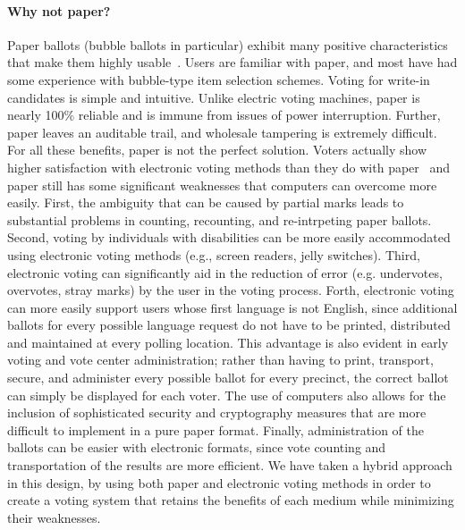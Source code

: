 \paragraph{Why not paper?}
Paper ballots (bubble ballots in particular) exhibit many positive characteristics that make them highly usable~\cite{hfes-06,byrne-baseline}. Users are familiar with paper, and most have had some experience with bubble-type item selection schemes. Voting for write-in candidates is simple and intuitive. Unlike electric voting machines, paper is nearly 100\% reliable and is immune from issues of power interruption. Further, paper leaves an auditable trail, and wholesale tampering is extremely difficult. 
For all these benefits, paper is not the perfect solution. Voters actually show higher satisfaction with electronic voting methods than they do with paper~\cite{everett08chi-dre-usability} and paper still has some significant weaknesses that computers can overcome more easily. 
First, the ambiguity that can be caused by partial marks leads to substantial problems in counting, recounting, and re-intrpeting paper ballots.
Second, voting by individuals with disabilities can be more easily accommodated using electronic voting methods (e.g., screen readers, jelly switches).
Third, electronic voting can significantly aid in the reduction of error (e.g. undervotes, overvotes, stray marks) by the user in the voting process.
Forth, electronic voting can more easily support users whose first language is not English, since additional ballots for every possible language request do not have to be printed, distributed and maintained at every polling location. This advantage is also evident in early voting and vote center administration; rather than having to print, transport, secure, and administer every possible ballot for every precinct, the correct ballot can simply be displayed for each voter. The use of computers also allows for the inclusion of sophisticated security and cryptography measures that are more difficult to implement in a pure paper format.
Finally, administration of the ballots can be easier with electronic formats, since vote counting and transportation of the results are more efficient.
We have taken a hybrid approach in this design, by using both paper and electronic voting methods in order to create a voting system that retains the benefits of each medium while minimizing their weaknesses. 
